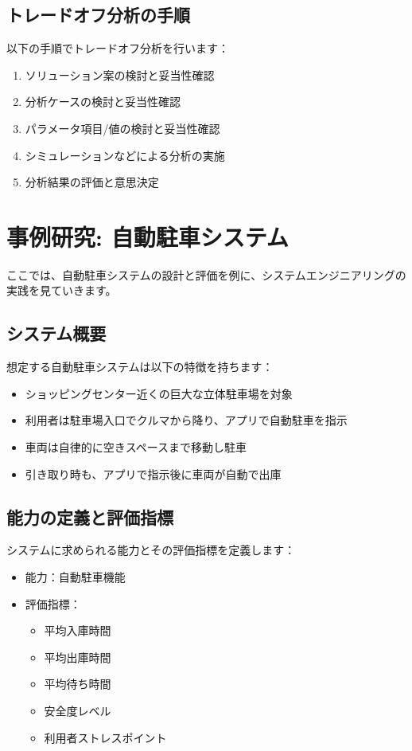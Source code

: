 \subsection{トレードオフ分析の手順}

以下の手順でトレードオフ分析を行います：

\begin{enumerate}
    \item ソリューション案の検討と妥当性確認
    \item 分析ケースの検討と妥当性確認
    \item パラメータ項目/値の検討と妥当性確認
    \item シミュレーションなどによる分析の実施
    \item 分析結果の評価と意思決定
\end{enumerate}

\section{事例研究: 自動駐車システム}

ここでは、自動駐車システムの設計と評価を例に、システムエンジニアリングの実践を見ていきます。

\subsection{システム概要}

想定する自動駐車システムは以下の特徴を持ちます：

\begin{itemize}
    \item ショッピングセンター近くの巨大な立体駐車場を対象
    \item 利用者は駐車場入口でクルマから降り、アプリで自動駐車を指示
    \item 車両は自律的に空きスペースまで移動し駐車
    \item 引き取り時も、アプリで指示後に車両が自動で出庫
\end{itemize}

\subsection{能力の定義と評価指標}

システムに求められる能力とその評価指標を定義します：

\begin{itemize}
    \item 能力：自動駐車機能
    \item 評価指標：
    \begin{itemize}
        \item 平均入庫時間
        \item 平均出庫時間
        \item 平均待ち時間
        \item 安全度レベル
        \item 利用者ストレスポイント
    \end{itemize}
\end{itemize}


